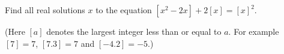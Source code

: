 \documentclass[varwidth]{standalone}
\begin{document}
    Find all real solutions $x$ to the equation $[x^2 - 2x] + 2[x] = [x]^2$.

    (Here $[a]$ denotes the largest integer less than or equal to $a$. For example $[7] = 7$, $[7.3] = 7$ and $[-4.2] = -5$.)
\end{document}
